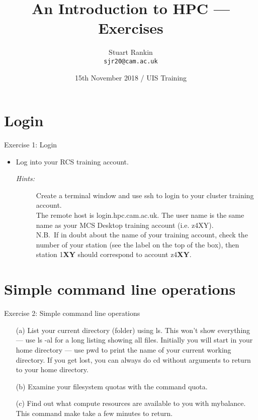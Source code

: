\documentclass{beamer}
\title[An Introduction to HPC on Minerva --- Exercises] %
{An Introduction to HPC --- Exercises}
\author[SJ Rankin] %
{Stuart Rankin\\ \texttt{sjr20@cam.ac.uk}}
\institute[UIS, University of Cambridge] %
{Research Computing Services (http://www.hpc.cam.ac.uk/)\\
University Information Services (http://www.uis.cam.ac.uk/)}
\date[15/11/2018] %
{15th November 2018 / UIS Training}
\begin{document}
\begin{frame}
  \titlepage
\end{frame}

\section{Login}
\begin{frame}{Exercise 1: Login}
\begin{itemize}
\item{Log into your RCS training account.}
\begin{description}
\item[\emph{Hints:}]{\small Create a terminal window and use \alert{ssh} to login to your cluster training account. \\\smallskip
The remote host is \alert{login.hpc.cam.ac.uk}. The user name is the same name as your MCS Desktop training account (i.e. \alert{z4XY}).\hfill\\\smallskip
{\scriptsize N.B.\ If in doubt about the name of your training account, check the number of your station (see the label on the top of the box), then station 1\textbf{XY} should correspond to account z4\textbf {XY}.}\hfill\\\smallskip
}
\end{description}
\end{itemize}
\end{frame}


\section{Simple command line operations}
\begin{frame}{Exercise 2: Simple command line operations}
\begin{itemize}

\item[(a)]{List your current directory (folder) using \alert{ls}. This won't show everything --- use \alert{ls -al} for a long listing showing all files. Initially you will start in your home directory --- use \alert{pwd} to print the name of your current working directory. If you get lost, you can always do \alert{cd} without arguments to return to your home directory.}

\item[(b)]{Examine your filesystem quotas with the command \alert{quota}.}
 
\item[(c)]{Find out what compute resources are available to you with \alert{mybalance}. This command make take a few minutes to return.}

\end{itemize}
\end{frame}
\end{document}

